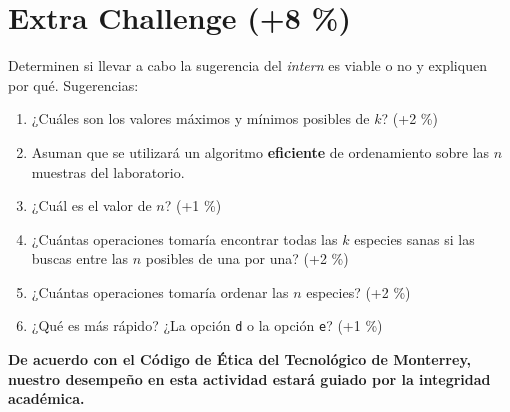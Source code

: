 \documentclass[8pt, onside]{article}
\begin{document}
\section*{Extra Challenge (+8 \%)}

Determinen si llevar a cabo la sugerencia del \textit{intern} es viable o no y expliquen por qué. Sugerencias:

\begin{enumerate}[label=\tt \alph*)]
    \item ¿Cuáles son los valores máximos y mínimos posibles de $k$? (+2 \%)
    \item Asuman que se utilizará un algoritmo \textbf{eficiente} de ordenamiento sobre las $n$ muestras del laboratorio.
    \item ¿Cuál es el valor de $n$? (+1 \%)
    \item ¿Cuántas operaciones tomaría encontrar todas las $k$ especies sanas si las buscas entre las $n$ posibles de una por una? (+2 \%)
    \item ¿Cuántas operaciones tomaría ordenar las $n$ especies? (+2 \%)
    \item ¿Qué es más rápido? ¿La opción \texttt{d} o la opción \texttt{e}? (+1 \%)
\end{enumerate}

\vfill

\textbf{De acuerdo con el Código de Ética del Tecnológico de Monterrey, nuestro desempeño en esta actividad estará guiado por la integridad académica.}
\end{document}
